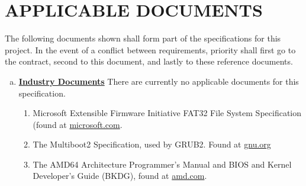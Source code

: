 \section{APPLICABLE DOCUMENTS}
The following documents shown shall form part of the specifications for this project. In the event of a conflict between requirements, priority shall first go to the contract, second to this 
document, and lastly to these reference documents.
\begin{enumerate}[(a)]
  \item \textbf{\underline{Industry Documents}}	
      There are currently no applicable documents for this specification.
      \begin{enumerate}[(1)]
        \item Microsoft Extensible Firmware Initiative FAT32 File System Specification (found at \href{http://download.microsoft.com/download/1/6/1/161ba512-40e2-4cc9-843a-923143f3456c/fatgen103.doc}{microsoft.com}.
        \item The Multiboot2 Specification, used by GRUB2. Found at \href{https://www.gnu.org/software/grub/manual/multiboot2/multiboot.html}{gnu.org}
        \item The AMD64 Architecture Programmer's Manual and BIOS and Kernel Developer's Guide (BKDG), found at \href{https://developer.amd.com/resources/developer-guides-manuals/}{amd.com}.
        
      \end{enumerate}

\end{enumerate}

